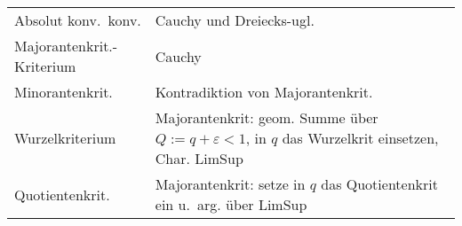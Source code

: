 \documentclass[10pt]{article}
\begin{document}
\begin{center}
\begin{tabular}{lp{5cm}}
                Absolut konv.\  konv. & Cauchy und Dreiecks-ugl.\\
                Majorantenkrit.-Kriterium & Cauchy\\
                Minorantenkrit. & Kontradiktion von Majorantenkrit.\\
                Wurzelkriterium & Majorantenkrit: geom. Summe über $Q:=q+\varepsilon<1$, in $q$ das Wurzelkrit einsetzen, Char. LimSup\\
                Quotientenkrit. & Majorantenkrit: setze in $q$ das Quotientenkrit ein u.\ arg. über LimSup \\
            \bottomrule
        \end{tabular}
    \end{center}
\end{document}
